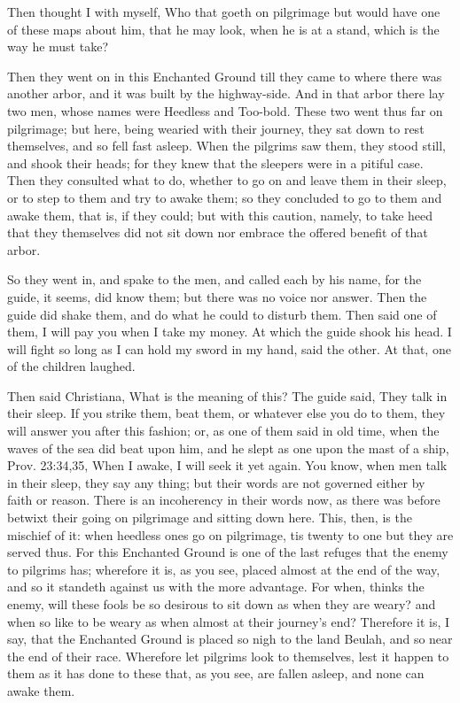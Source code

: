 Then thought I with myself, Who that goeth on pilgrimage but would have one of these maps about him, that he may look, when he is at a stand, which is the way he must take?

Then they went on in this Enchanted Ground till they came to where there was another arbor, and it was built by the highway-side. And in that arbor there lay two men, whose names were Heedless and Too-bold. These two went thus far on pilgrimage; but here, being wearied with their journey, they sat down to rest themselves, and so fell fast asleep. When the pilgrims saw them, they stood still, and shook their heads; for they knew that the sleepers were in a pitiful case. Then they consulted what to do, whether to go on and leave them in their sleep, or to step to them and try to awake them; so they concluded to go to them and awake them, that is, if they could; but with this caution, namely, to take heed that they themselves did not sit down nor embrace the offered benefit of that arbor.

So they went in, and spake to the men, and called each by his name, for the guide, it seems, did know them; but there was no voice nor answer. Then the guide did shake them, and do what he could to disturb them. Then said one of them, I will pay you when I take my money. At which the guide shook his head. I will fight so long as I can hold my sword in my hand, said the other. At that, one of the children laughed.

Then said Christiana, What is the meaning of this? The guide said, They talk in their sleep. If you strike them, beat them, or whatever else you do to them, they will answer you after this fashion; or, as one of them said in old time, when the waves of the sea did beat upon him, and he slept as one upon the mast of a ship, Prov. 23:34,35, When I awake, I will seek it yet again. You know, when men talk in their sleep, they say any thing; but their words are not governed either by faith or reason. There is an incoherency in their words now, as there was before betwixt their going on pilgrimage and sitting down here. This, then, is the mischief of it: when heedless ones go on pilgrimage, tis twenty to one but they are served thus. For this Enchanted Ground is one of the last refuges that the enemy to pilgrims has; wherefore it is, as you see, placed almost at the end of the way, and so it standeth against us with the more advantage. For when, thinks the enemy, will these fools be so desirous to sit down as when they are weary? and when so like to be weary as when almost at their journey's end? Therefore it is, I say, that the Enchanted Ground is placed so nigh to the land Beulah, and so near the end of their race. Wherefore let pilgrims look to themselves, lest it happen to them as it has done to these that, as you see, are fallen asleep, and none can awake them.

